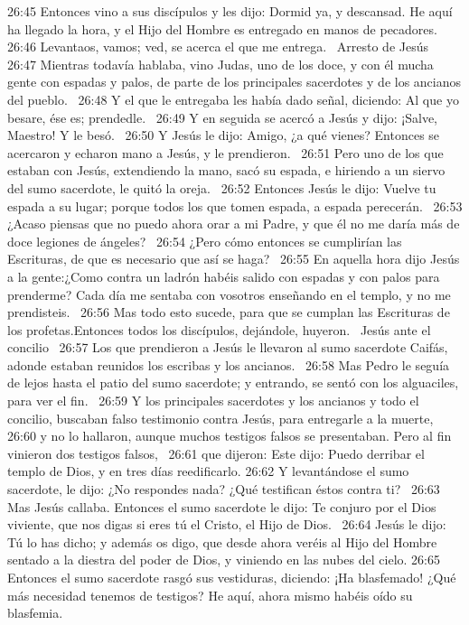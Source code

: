 26:45 Entonces vino a sus discípulos y les dijo: Dormid ya, y descansad. He aquí ha llegado la hora, y el Hijo del Hombre es entregado en manos de pecadores.  
26:46 Levantaos, vamos; ved, se acerca el que me entrega.  
Arresto de Jesús   
26:47 Mientras todavía hablaba, vino Judas, uno de los doce, y con él mucha gente con espadas y palos, de parte de los principales sacerdotes y de los ancianos del pueblo.  
26:48 Y el que le entregaba les había dado señal, diciendo: Al que yo besare, ése es; prendedle.  
26:49 Y en seguida se acercó a Jesús y dijo: ¡Salve, Maestro! Y le besó.  
26:50 Y Jesús le dijo: Amigo, ¿a qué vienes? Entonces se acercaron y echaron mano a Jesús, y le prendieron.  
26:51 Pero uno de los que estaban con Jesús, extendiendo la mano, sacó su espada, e hiriendo a un siervo del sumo sacerdote, le quitó la oreja.  
26:52 Entonces Jesús le dijo: Vuelve tu espada a su lugar; porque todos los que tomen espada, a espada perecerán.  
26:53 ¿Acaso piensas que no puedo ahora orar a mi Padre, y que él no me daría más de doce legiones de ángeles?  
26:54 ¿Pero cómo entonces se cumplirían las Escrituras, de que es necesario que así se haga?  
26:55 En aquella hora dijo Jesús a la gente:¿Como contra un ladrón habéis salido con espadas y con palos para prenderme? Cada día me sentaba con vosotros enseñando en el templo, y no me prendisteis.  
26:56 Mas todo esto sucede, para que se cumplan las Escrituras de los profetas.Entonces todos los discípulos, dejándole, huyeron.  
Jesús ante el concilio   
26:57 Los que prendieron a Jesús le llevaron al sumo sacerdote Caifás, adonde estaban reunidos los escribas y los ancianos.  
26:58 Mas Pedro le seguía de lejos hasta el patio del sumo sacerdote; y entrando, se sentó con los alguaciles, para ver el fin.  
26:59 Y los principales sacerdotes y los ancianos y todo el concilio, buscaban falso testimonio contra Jesús, para entregarle a la muerte,  
26:60 y no lo hallaron, aunque muchos testigos falsos se presentaban. Pero al fin vinieron dos testigos falsos,  
26:61 que dijeron: Este dijo: Puedo derribar el templo de Dios, y en tres días reedificarlo. 
26:62 Y levantándose el sumo sacerdote, le dijo: ¿No respondes nada? ¿Qué testifican éstos contra ti?  
26:63 Mas Jesús callaba. Entonces el sumo sacerdote le dijo: Te conjuro por el Dios viviente, que nos digas si eres tú el Cristo, el Hijo de Dios.  
26:64 Jesús le dijo: Tú lo has dicho; y además os digo, que desde ahora veréis al Hijo del Hombre sentado a la diestra del poder de Dios, y viniendo en las nubes del cielo. 
26:65 Entonces el sumo sacerdote rasgó sus vestiduras, diciendo: ¡Ha blasfemado! ¿Qué más necesidad tenemos de testigos? He aquí, ahora mismo habéis oído su blasfemia.  
